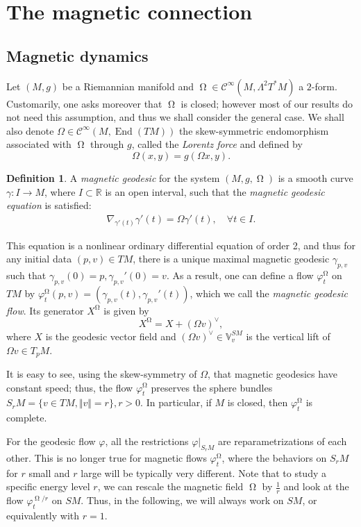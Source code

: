 \documentclass[12pt]{amsart}
\numberwithin{numbering}{section}
\theoremstyle{plain}
\theoremstyle{definition}
\newtheorem{df}[numbering]{Definition}
\theoremstyle{remark}
\numberwithin{equation}{section}
\DeclareMathOperator{\End}{End}
\DeclareMathOperator{\mg}{\Omega}
\newcommand{\R}{\mathbb{R}}
\begin{document}
\section{The magnetic connection} \label{sec:magnetic_connection}

\subsection{Magnetic dynamics} \label{sec:mag_dyn}

Let $(M, g)$ be a Riemannian manifold and $\mg \in \mathcal{C}^\infty(M, \Lambda^2 T^* M)$ a $2$-form. Customarily, one asks moreover that $\mg$ is closed; however most of our results do not need this assumption, and thus we shall consider the general case. We shall also denote $\Omega \in \mathcal{C}^\infty(M, \End(TM))$ the skew-symmetric endomorphism associated with $\mg$ through $g$, called the \emph{Lorentz force} and defined by 
\[\Omega(x, y) = g(\Omega x, y). \]

\begin{df} \label{def:mag_geodesic}
A \emph{magnetic geodesic} for the system $(M, g, \mg)$ is a smooth curve $\gamma: I \to M$, where $I \subset \R$ is an open interval, such that the \emph{magnetic geodesic equation} is satisfied:
\begin{align}
\nabla_{\gamma'(t)} \gamma'(t) = \Omega \gamma'(t), \quad \forall t \in I.
\end{align}
\end{df}

This equation is a nonlinear ordinary differential equation of order 2, and thus for any initial data $(p, v) \in TM$, there is a unique maximal magnetic geodesic $\gamma_{p, v}$ such that $\gamma_{p, v}(0) = p, \gamma_{p, v}'(0) = v$. As a result, one can define a flow $\varphi_t^{\mg}$ on $TM$ by $\varphi_t^{\mg}(p, v) = (\gamma_{p, v}(t), \gamma_{p, v}'(t))$, which we call the \emph{magnetic geodesic flow}. Its generator $X^{\mg}$ is given by
\[ X^{\mg} = X + (\Omega v)^\vee, \] 
where $X$ is the geodesic vector field and $(\Omega v)^\vee \in \mathbb{V}_v^{SM}$ is the vertical lift of $\Omega v \in T_p M$.

It is easy to see, using the skew-symmetry of $\Omega$, that magnetic geodesics have constant speed; thus, the flow $\varphi_t^{\mg}$ preserves the sphere bundles $S_r M = \{ v \in TM, \Vert v \Vert = r \}, r > 0$. In particular, if $M$ is closed, then $\varphi_t^{\mg}$ is complete.

For the geodesic flow $\varphi$, all the restrictions $\varphi \vert_{S_r M}$ are reparametrizations of each other. This is no longer true for magnetic flows $\varphi_t^{\mg}$, where the behaviors on $S_r M$ for $r$ small and $r$ large will be typically very different. Note that to study a specific energy level $r$, we can rescale the magnetic field $\mg$ by $\frac{1}{r}$ and look at the flow $\varphi_t^{\mg/r}$ on $SM$. Thus, in the following, we will always work on $SM$, or equivalently with $r = 1$.
\end{document}
